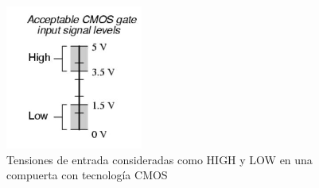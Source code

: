 %
\begin{figure}[H]
    \centering
        \centering
        \includegraphics[width=0.4\textwidth]{figs/Ej3/cmosvoltages.JPG} %
         \caption{Tensiones de entrada consideradas como HIGH y LOW en una compuerta con tecnología CMOS}
         \label{ej3_cmos}
\end{figure}